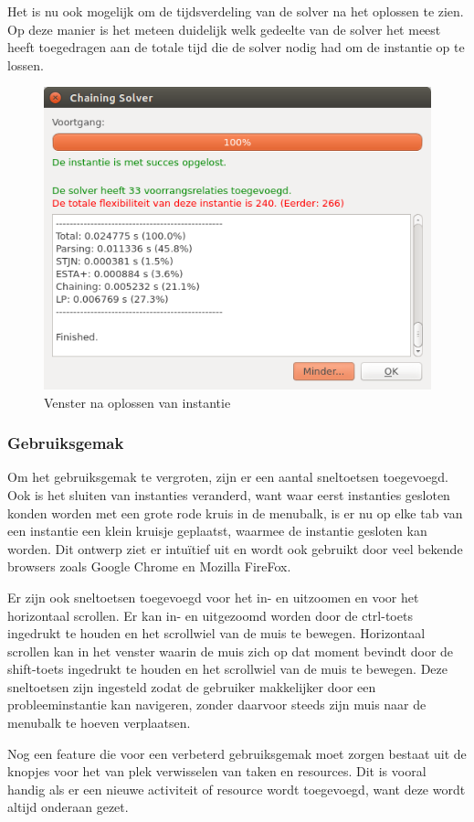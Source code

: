 Het is nu ook mogelijk om de tijdsverdeling van de solver na het oplossen te zien. Op deze manier is het meteen duidelijk welk gedeelte van de solver het meest heeft toegedragen aan de totale tijd die de solver nodig had om de instantie op te lossen.

\begin{figure}[H]
    \center
    \includegraphics[width=.7\textwidth]{../images/solver-dialog.png}
    \caption{Venster na oplossen van instantie}
    \label{fig:solver-dialog}
\end{figure}

\subsubsection*{Gebruiksgemak}
Om het gebruiksgemak te vergroten, zijn er een aantal sneltoetsen toegevoegd. Ook is het sluiten van instanties veranderd, want waar eerst instanties gesloten konden worden met een grote rode kruis in de menubalk, is er nu op elke tab van een instantie een klein kruisje geplaatst, waarmee de instantie gesloten kan worden. Dit ontwerp ziet er intu\"itief uit en wordt ook gebruikt door veel bekende browsers zoals Google Chrome en Mozilla FireFox.

Er zijn ook sneltoetsen toegevoegd voor het in- en uitzoomen en voor het horizontaal scrollen. Er kan in- en uitgezoomd worden door de ctrl-toets ingedrukt te houden en het scrollwiel van de muis  te bewegen. Horizontaal scrollen kan in het venster waarin de muis zich op dat moment bevindt door de shift-toets ingedrukt te houden en het scrollwiel van de muis te bewegen. Deze sneltoetsen zijn ingesteld zodat de gebruiker makkelijker door een probleeminstantie kan navigeren, zonder daarvoor steeds zijn muis naar de menubalk te hoeven verplaatsen.

Nog een feature die voor een verbeterd gebruiksgemak moet zorgen bestaat uit de knopjes voor het van plek verwisselen van taken en resources. Dit is vooral handig als er een nieuwe activiteit of resource wordt toegevoegd, want deze wordt altijd onderaan gezet. 

